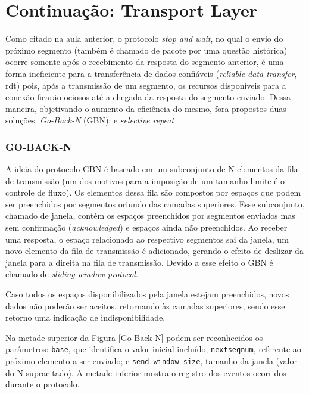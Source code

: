 



\hypertarget{continuauxe7uxe3o-transport-layer}{%
\chapter{Continuação: Transport Layer}\label{continuauxe7uxe3o-transport-layer}}

Como citado na aula anterior, o protocolo \emph{stop and wait}, no qual
o envio do próximo segmento (também é chamado de pacote por uma questão
histórica) ocorre somente após o recebimento da resposta do segmento
anterior, é uma forma ineficiente para a transferência de dados
confiáveis (\emph{reliable data transfer}, rdt) pois, após a transmissão
de um segmento, os recursos disponíveis para a conexão ficarão ociosos
até a chegada da resposta do segmento enviado. Dessa maneira,
objetivando o aumento da eficiência do mesmo, fora propostos duas
soluções: \emph{Go-Back-N} (GBN); e \emph{selective repeat}

\hypertarget{go-back-n}{%
\subsection{GO-BACK-N}\label{go-back-n}}

A ideia do protocolo GBN é baseado em um subconjunto de N elementos da
fila de transmissão (um dos motivos para a imposição de um tamanho
limite é o controle de fluxo). Os elementos dessa fila são compostos por
espaços que podem ser preenchidos por segmentos oriundo das camadas
superiores. Esse subconjunto, chamado de janela, contém os espaços
preenchidos por segmentos enviados mas sem confirmação
(\emph{acknowledged}) e espaços ainda não preenchidos. Ao receber uma
resposta, o espaço relacionado ao respectivo segmentos sai da janela, um
novo elemento da fila de transmissão é adicionado, gerando o efeito de
deslizar da janela para a direita na fila de transmissão. Devido a esse
efeito o GBN é chamado de \emph{sliding-window protocol}.

Caso todos os espaços disponibilizados pela janela estejam preenchidos,
novos dados não poderão ser aceitos, retornando às camadas superiores,
sendo esse retorno uma indicação de indisponibilidade.

Na metade superior da Figura \ref{Go-Back-N} podem ser reconhecidos os parâmetros:
\texttt{base}, que identifica o valor inicial incluído;
\texttt{nextseqnum}, referente ao próximo elemento a ser enviado; e
\texttt{send\ window\ size}, tamanho da janela (valor do N supracitado).
A metade inferior mostra o registro dos eventos ocorridos durante o
protocolo.

